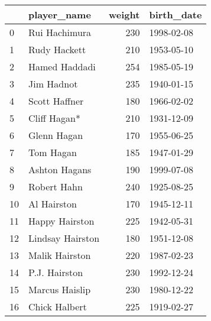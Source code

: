 \begin{tabular}{llrl}
\toprule
{} &       player\_name &  weight &  birth\_date \\
\midrule
0  &     Rui Hachimura &     230 &  1998-02-08 \\
1  &      Rudy Hackett &     210 &  1953-05-10 \\
2  &     Hamed Haddadi &     254 &  1985-05-19 \\
3  &        Jim Hadnot &     235 &  1940-01-15 \\
4  &     Scott Haffner &     180 &  1966-02-02 \\
5  &      Cliff Hagan* &     210 &  1931-12-09 \\
6  &       Glenn Hagan &     170 &  1955-06-25 \\
7  &         Tom Hagan &     185 &  1947-01-29 \\
8  &     Ashton Hagans &     190 &  1999-07-08 \\
9  &       Robert Hahn &     240 &  1925-08-25 \\
10 &       Al Hairston &     170 &  1945-12-11 \\
11 &    Happy Hairston &     225 &  1942-05-31 \\
12 &  Lindsay Hairston &     180 &  1951-12-08 \\
13 &    Malik Hairston &     220 &  1987-02-23 \\
14 &     P.J. Hairston &     230 &  1992-12-24 \\
15 &    Marcus Haislip &     230 &  1980-12-22 \\
16 &     Chick Halbert &     225 &  1919-02-27 \\
\bottomrule
\end{tabular}

